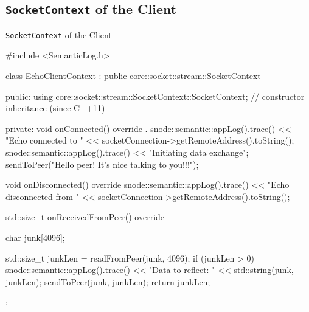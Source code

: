 ﻿\subsection{\texttt{SocketContext} of the Client}

\begin{frame}[fragile]{\texttt{SocketContext} of the Client}
  \begin{cppcode}[autogobble=true, caption={\alert{SocketContext} of the client.},captionpos=b]
    #include <SemanticLog.h>

    class EchoClientContext : public core::socket::stream::SocketContext {
    public:
        using core::socket::stream::SocketContext::SocketContext; // constructor inheritance (since C++11)

    private:
        void onConnected() override {.
            snode::semantic::appLog().trace() << "Echo connected to " << socketConnection->getRemoteAddress().toString();
            snode::semantic::appLog().trace() << "Initiating data exchange";
            sendToPeer("Hello peer! It's nice talking to you!!!");
        }

        void onDisconnected() override {
            snode::semantic::appLog().trace() << "Echo disconnected from " << socketConnection->getRemoteAddress().toString();
        }

        std::size_t onReceivedFromPeer() override {
            char junk[4096];

            std::size_t junkLen = readFromPeer(junk, 4096);
            if (junkLen > 0) {
                snode::semantic::appLog().trace() << "Data to reflect: " << std::string(junk, junkLen);
                sendToPeer(junk, junkLen);
            }
            return junkLen;
        }
    };
  \end{cppcode}
\end{frame}
